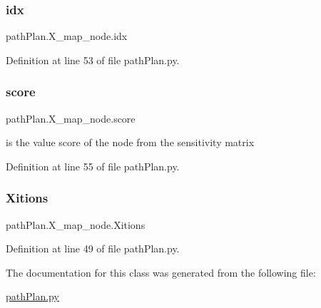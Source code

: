\mbox{\label{classpath_plan_1_1_x__map__node_a6e7953ce0421332ab2abd92c72b6b4fc}} 
\subsubsection{\texorpdfstring{idx}{idx}}
{\footnotesize\ttfamily path\+Plan.\+X\+\_\+map\+\_\+node.\+idx}



Definition at line 53 of file path\+Plan.\+py.

\mbox{\label{classpath_plan_1_1_x__map__node_a4d4c6e2da85e62606182e68fb19a22c5}} 
\subsubsection{\texorpdfstring{score}{score}}
{\footnotesize\ttfamily path\+Plan.\+X\+\_\+map\+\_\+node.\+score}



is the value score of the node from the sensitivity matrix 



Definition at line 55 of file path\+Plan.\+py.

\mbox{\label{classpath_plan_1_1_x__map__node_abcc46c0a97c98ba2dcf9499f36dc4a74}} 
\subsubsection{\texorpdfstring{Xitions}{Xitions}}
{\footnotesize\ttfamily path\+Plan.\+X\+\_\+map\+\_\+node.\+Xitions}



Definition at line 49 of file path\+Plan.\+py.



The documentation for this class was generated from the following file\+:\begin{DoxyCompactItemize}
\item 
\mbox{\hyperlink{path_plan_8py}{path\+Plan.\+py}}\end{DoxyCompactItemize}
